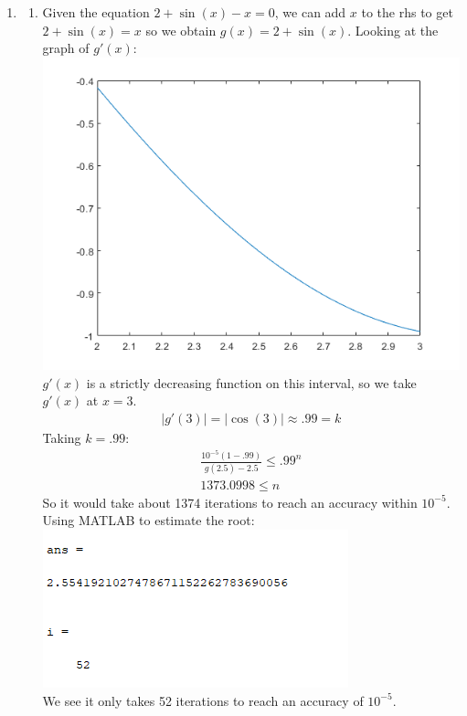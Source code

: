 \documentclass[12pt,letterpaper]{article}
\begin{document}
\begin{enumerate}
    \item 
    \begin{enumerate}
      \item 
      Given the equation $2 + \sin(x) - x = 0$, we can add $x$ to the rhs to get 
      $2+\sin(x) = x$ so we obtain $g(x) = 2+\sin(x)$. Looking at the graph of 
      $g'(x)$: 
      \includegraphics{number2a.png}\\
      $g'(x)$ is a strictly decreasing function on this interval, so we take 
      $g'(x)$ at $x = 3$. 
      \begin{gather*}
        |g'(3)| = |\cos(3)| \approx .99 = k
      \end{gather*}
      Taking $k = .99$: 
      \begin{gather*}
        \frac{10^{-5}(1-.99)}{g(2.5) - 2.5} \leq .99^n\\
        1373.0998 \leq n
      \end{gather*}
      So it would take about 1374 iterations to reach an accuracy within $10^{-5}$. 
      Using MATLAB to estimate the root: \\
      \includegraphics{number2aa.png}\\
      We see it only takes 52 iterations to reach an accuracy of $10^{-5}$.


\end{enumerate}
\end{enumerate}
\end{document}
